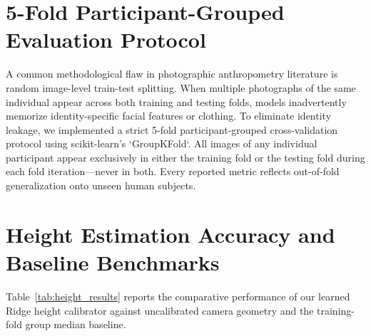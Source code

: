 \documentclass[12pt,a4paper,oneside]{report}
\begin{document}
\section{5-Fold Participant-Grouped Evaluation Protocol}
A common methodological flaw in photographic anthropometry literature is random image-level train-test splitting. When multiple photographs of the same individual appear across both training and testing folds, models inadvertently memorize identity-specific facial features or clothing. To eliminate identity leakage, we implemented a strict 5-fold participant-grouped cross-validation protocol using scikit-learn's `GroupKFold`. All images of any individual participant appear exclusively in either the training fold or the testing fold during each fold iteration---never in both. Every reported metric reflects out-of-fold generalization onto unseen human subjects.

\section{Height Estimation Accuracy and Baseline Benchmarks}
Table~\ref{tab:height_results} reports the comparative performance of our learned Ridge height calibrator against uncalibrated camera geometry and the training-fold group median baseline.

\begin{table}[H]
\centering
\caption{5-Fold Participant-Grouped Performance Metrics for Height and Weight}
\label{tab:height_results}
\end{table}
\end{document}

